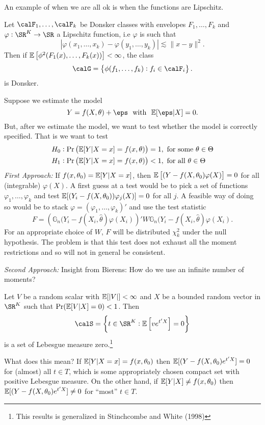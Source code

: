 An example of when we are all ok is when the functions are Lipschitz. 
\begin{theorem}
	\label{thm:lipschitz-donsker}
	Let \(\calF_1,\dots,\calF_k\) be Donsker classes with envelopes \(F_1,\dots,F_k\) and \(\varphi:\SR^K\to\SR\) a Lipschitz function, i.e \(\varphi\) is such that 
	\[
		\left|\varphi(x_1,\dots,x_k) - \varphi(y_1,\dots,y_k)\right| \lesssim \|x-y\|^2 
	.\]
	Then if \(\mathbb{E}\left[\phi^2(F_1(x),\dots,F_k(x))\right] < \infty\), the class 
	\[
		\calG = \left\{\phi(f_1,\dots,f_k): f_i\in\calF_i\right\}
	.\]
	is Donsker.
\end{theorem}
\begin{example*}
	Suppose we estimate the model
	\[
		Y = f(X,\theta) + \eps\hbox{ }\text{ with }\hbox{ }\E[\eps|X]=0
	.\]
	But, after we estimate the model, we want to test whether the model is correctly specified. That is we want to test
	\begin{align*}
		\centering
		H_0&: \Pr\left(\E[Y|X=x] = f(x,\theta)\right) = 1,\text{ for some \(\theta\in\Theta\)} \\
		H_1&: \Pr\left(\E[Y|X=x] = f(x,\theta)\right) < 1,\text{ for all } \theta\in\Theta
	\end{align*}
	\textit{First Approach: }If \(f(x,\theta_0) = \mathbb{E}[Y|X=x]\), then \(\mathbb{E}\left[(Y-f(X,\theta_0)\varphi(X)\right] = 0\) for all (integrable) \(\varphi(X)\). A first guess at a test would be to pick a set of functions \(\varphi_1,\dots,\varphi_k\) and test \(\mathbb{E}[(Y_i-f(X,\theta_0))\varphi_j(X)] = 0\) for all \(j\). A feasible way of doing so would be to stack \(\varphi= (\varphi_1,\dots,\varphi_k)'\) and use the test statistic
	\[
		F = \left(\mathbb{G}_n(Y_i-f(X_i,\hat\theta)\varphi(X_i)\right)'W\mathbb{G}_n(Y_i-f(X_i,\hat\theta)\varphi(X_i)
	.\] 
	For an appropriate choice of \(W\), \(F\) will be distributed \(\chi^2_k\) under the null hypothesis. The problem is that this test does not exhaust all the moment restrictions and so will not in general be consistent. 

	\textit{Second Approach: } Insight from Bierens: How do we use an infinite number of moments?
	\begin{lemma}[Bierens 1990]
		\label{lemma:bierens-1990}
		Let \(V\) be a random scalar with \(\mathbb{E}[|V|]<\infty\) and \(X\) be a bounded random vector in \(\SR^K\) such that \(\Pr(\mathbb{E}[V|X]=0)<1\). Then \[\calS = \left\{t\in\SR^K: \E\left[ve^{t'X}\right]=0\right\}\] is a set of Lebesgue measure zero.\footnote{This results is generalized in Stinchcombe and White (1998)}
	\end{lemma}
	What does this mean? If \(\mathbb{E}[Y|X=x]=f(x,\theta_0)\) then \(\mathbb{E}[(Y-f(X,\theta_0)e^{t'X}]=0\) for (almost) all \(t\in T\), which is some appropriately chosen compact set with positive Lebesgue measure. On the other hand, if \(\mathbb{E}[Y|X]\neq f(x,\theta_0)\) then \(\mathbb{E}[(Y-f(X,\theta_0)e^{t'X}]\neq0\) for ``most'' \(t\in T\).


\end{example*}
